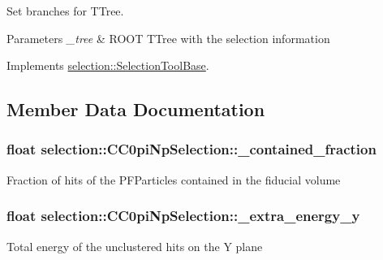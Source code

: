 Set branches for T\+Tree. 


\begin{DoxyParams}{Parameters}
{\em \+\_\+tree} & R\+O\+OT T\+Tree with the selection information \\
\hline
\end{DoxyParams}


Implements \hyperlink{classselection_1_1SelectionToolBase_aa97ea5e55391240d8e251dae13897996}{selection\+::\+Selection\+Tool\+Base}.



\subsection{Member Data Documentation}
\subsubsection[{\texorpdfstring{\+\_\+contained\+\_\+fraction}{_contained_fraction}}]{\setlength{\rightskip}{0pt plus 5cm}float selection\+::\+C\+C0pi\+Np\+Selection\+::\+\_\+contained\+\_\+fraction\hspace{0.3cm}{\ttfamily [private]}}\hypertarget{classselection_1_1CC0piNpSelection_a8e7933222bce1424aee24bae8dcf4864}{}\label{classselection_1_1CC0piNpSelection_a8e7933222bce1424aee24bae8dcf4864}
Fraction of hits of the P\+F\+Particles contained in the fiducial volume 
\subsubsection[{\texorpdfstring{\+\_\+extra\+\_\+energy\+\_\+y}{_extra_energy_y}}]{\setlength{\rightskip}{0pt plus 5cm}float selection\+::\+C\+C0pi\+Np\+Selection\+::\+\_\+extra\+\_\+energy\+\_\+y\hspace{0.3cm}{\ttfamily [private]}}\hypertarget{classselection_1_1CC0piNpSelection_a2e386c361ecc27d22ff2642e80a629e4}{}\label{classselection_1_1CC0piNpSelection_a2e386c361ecc27d22ff2642e80a629e4}
Total energy of the unclustered hits on the Y plane 
